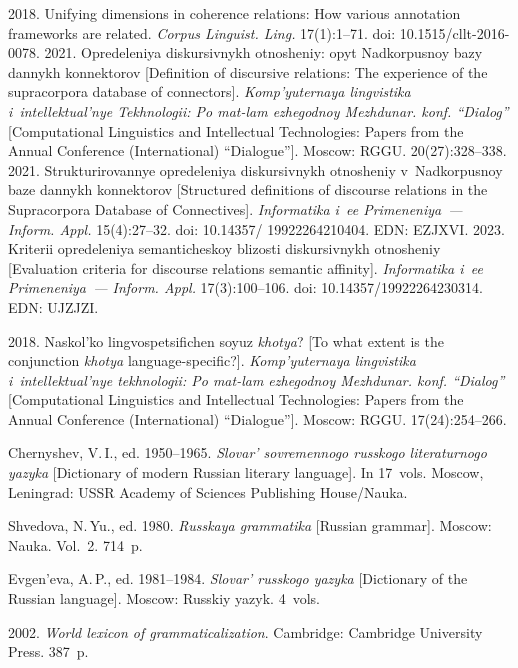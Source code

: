 \begin{multicols}{2}
{{\begin{thebibliography}{99}
 2018. Unifying dimensions in coherence relations: How various annotation 
frameworks are related. \textit{Corpus Linguist. Ling.} 17(1):1--71. doi: 10.1515/cllt-2016-0078.
 2021. Opredeleniya diskursivnykh otnosheniy: opyt Nadkorpusnoy bazy 
dannykh konnektorov [Definition of discursive relations: The experience of the supracorpora 
database of connectors]. \textit{Komp'yuternaya lingvistika i~intellektual'nye Tekhnologii: Po 
mat-lam ezhegodnoy Mezhdunar.  konf. ``Dialog''} [Computational Linguistics 
and Intellectual Technologies: Papers from the Annual Conference (International) ``Dialogue'']. 
Moscow: RGGU. 20(27):328--338.
 2021. Strukturirovannye opredeleniya 
diskursivnykh otnosheniy v~Nadkorpusnoy baze dannykh konnektorov [Structured definitions of 
discourse relations in the Supracorpora Database of Connectives]. \textit{Informatika i~ee 
Primeneniya~--- Inform. Appl.} 15(4):27--32. doi: 10.14357/ 19922264210404. EDN: EZJXVI.
 2023. Kriterii opredeleniya semanticheskoy blizosti 
diskursivnykh otnosheniy [Evaluation criteria for discourse relations semantic affinity]. 
\textit{Informatika i~ee Primeneniya~--- Inform. Appl.} 17(3):100--106. doi: 
10.14357/19922264230314. EDN: UJZJZI.

\pagebreak


 2018. Naskol'ko lingvospetsifichen soyuz \textit{khotya}? [To 
what extent is the conjunction \textit{khotya} language-specific?]. \textit{Komp'yuternaya lingvistika 
i~intellektual'nye tekhnologii: Po mat-lam ezhegodnoy Mezhdunar. konf. ``Dialog''} 
[Computational Linguistics and Intellectual Technologies: Papers from the Annual Conference 
(International) ``Dialogue'']. Moscow: RGGU. 17(24):254--266. 

Chernyshev, V.\,I., ed. 1950--1965. \textit{Slovar' sovremennogo russkogo literaturnogo yazyka} 
[Dictionary of modern Russian literary language]. In 17~vols. Moscow, Leningrad: USSR Academy 
of Sciences Publishing House/Nauka.

Shvedova, N.\,Yu., ed. 1980. \textit{Russkaya grammatika} [Russian grammar]. Moscow: Nauka. Vol.~2. 714~p.

Evgen'eva, A.\,P., ed. 1981--1984. \textit{Slovar' russkogo yazyka} [Dictionary of the Russian 
language].  Moscow: Russkiy yazyk. 4~vols.


 2002. \textit{World lexicon of grammaticalization}. Cambridge: 
Cambridge University Press. 387~p.

\end{thebibliography}

 }
 }

\end{multicols}

